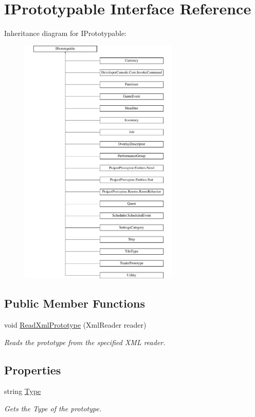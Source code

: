 \hypertarget{interface_i_prototypable}{}\section{I\+Prototypable Interface Reference}
\label{interface_i_prototypable}
Inheritance diagram for I\+Prototypable\+:\begin{figure}[H]
\begin{center}
\leavevmode
\includegraphics[height=12.000000cm]{interface_i_prototypable}
\end{center}
\end{figure}
\subsection*{Public Member Functions}
\begin{DoxyCompactItemize}
\item 
void \hyperlink{interface_i_prototypable_a024d752c4be655a7166db5718f1fad6a}{Read\+Xml\+Prototype} (Xml\+Reader reader)
\begin{DoxyCompactList}\small\item\em Reads the prototype from the specified X\+ML reader. \end{DoxyCompactList}\end{DoxyCompactItemize}
\subsection*{Properties}
\begin{DoxyCompactItemize}
\item 
string \hyperlink{interface_i_prototypable_a89142abefe29051caf772e98e7d78e81}{Type}
\begin{DoxyCompactList}\small\item\em Gets the Type of the prototype. \end{DoxyCompactList}\end{DoxyCompactItemize}



